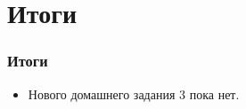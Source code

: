 \documentclass{beamer}
\begin{document}
\section{Итоги}

\begin{frame}
\frametitle{Итоги}

\begin{itemize}
\item Нового домашнего задания 3 пока нет.
\end{itemize}


\end{frame}
\end{document}
